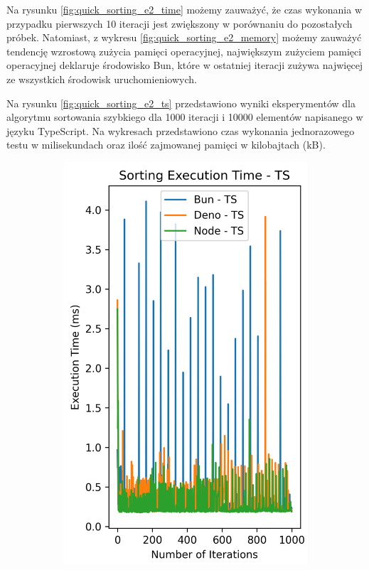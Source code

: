 Na rysunku \ref{fig:quick_sorting_e2_time} możemy zauważyć, że czas wykonania w przypadku pierwszych 10 iteracji jest zwiększony w porównaniu do pozostałych próbek. Natomiast, z wykresu \ref{fig:quick_sorting_e2_memory} możemy zauważyć tendencję wzrostową zużycia pamięci operacyjnej, największym zużyciem pamięci operacyjnej deklaruje środowisko Bun, które w ostatniej iteracji zużywa najwięcej ze wszystkich środowisk uruchomieniowych.

Na rysunku \ref{fig:quick_sorting_e2_ts} przedstawiono wyniki eksperymentów dla algorytmu sortowania szybkiego dla 1000 iteracji i 10000 elementów napisanego w języku TypeScript. Na wykresach przedstawiono czas wykonania jednorazowego testu w milisekundach oraz ilość zajmowanej pamięci w kilobajtach (kB).

\begin{figure}[H]
  \centering
  \begin{subfigure}[b]{0.44\textwidth}
    \centering
    \includegraphics[width=\textwidth]{Figures/sorting/sorting_quick_1000_1000_ts_time.png}

\end{subfigure}
\end{figure}
